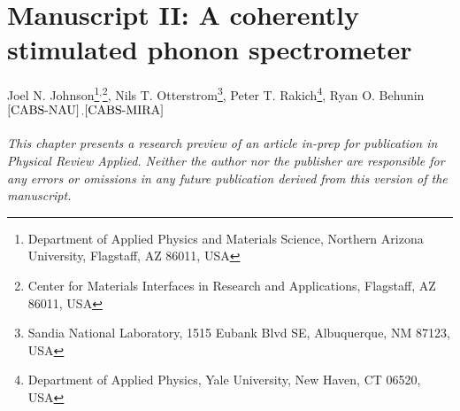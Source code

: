\setcounter{rownumber}{0}
\chapter{Manuscript II: A coherently stimulated phonon spectrometer}
\label{ch:CABS}
\acresetall


%
Joel N. Johnson\footnote{\label{CABS-NAU}
Department of Applied Physics and Materials Science, Northern Arizona University, Flagstaff, AZ 86011, USA
}$^,$\footnote{\label{CABS-MIRA}
Center for Materials Interfaces in Research and Applications, Flagstaff, AZ 86011, USA
},
Nils T. Otterstrom\footnote{\label{CABS-Sandia}
Sandia National Laboratory, 1515 Eubank Blvd SE, Albuquerque, NM 87123, USA
},
Peter T. Rakich\footnote{\label{CABS-Yale}
Department of Applied Physics, Yale University, New Haven, CT 06520, USA
},
Ryan O. Behunin$^\mathrm{\ref{CABS-NAU}}$$^,$$^\mathrm{\ref{CABS-MIRA}}$

\hfill

%
\textit{This chapter presents a research preview of an article in-prep for publication in Physical Review Applied. Neither the author nor the publisher are responsible for any errors or omissions in any future publication derived from this version of the manuscript.}

\doublespacing




